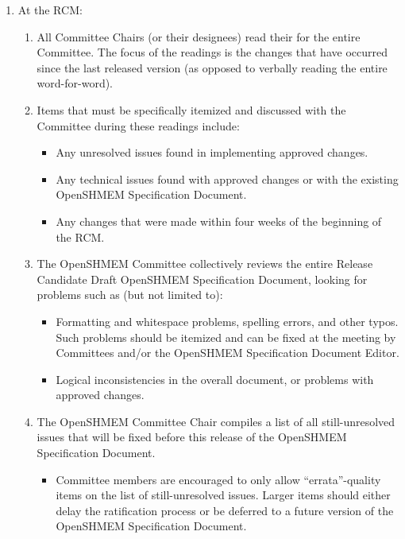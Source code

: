 \begin{enumerate}
\item At the RCM:
  \begin{enumerate}
  \item All  Committee Chairs (or their designees) read their
     for the entire Committee.  The focus of the readings is the
    changes that have occurred since the last released version  (as
    opposed to verbally reading the entire  word-for-word).
  \item Items that must be specifically itemized and discussed with
    the Committee during these readings include:
    \begin{itemize}
    \item Any unresolved issues found in implementing approved
      changes.
    \item Any technical issues found with approved changes or with the
      existing OpenSHMEM Specification Document.
    \item Any changes that were made within four weeks of the
      beginning of the RCM.
    \end{itemize}

  \item The OpenSHMEM Committee collectively reviews the entire Release
    Candidate Draft OpenSHMEM Specification Document, looking for problems such
    as (but not limited to):
    \begin{itemize}
    \item Formatting and whitespace problems, spelling errors, and
      other typos.  Such problems should be itemized and can be fixed
      at the meeting by  Committees and/or the OpenSHMEM Specification
      Document Editor.
    \item Logical inconsistencies in the overall document, or problems
      with approved changes.
    \end{itemize}

  \item The OpenSHMEM Committee Chair compiles a list of all still-unresolved
    issues that will be fixed before this release of the OpenSHMEM Specification
    Document.
    \begin{itemize}
    \item Committee members are encouraged to only allow
      ``errata''-quality items on the list of still-unresolved
      issues.  Larger items should either delay the ratification
      process or be deferred to a future version of the OpenSHMEM Specification
      Document.
    \end{itemize}


\end{enumerate}
\end{enumerate}
